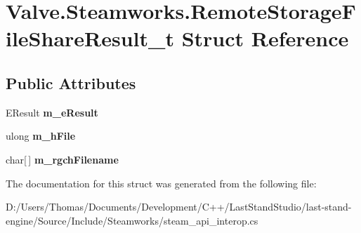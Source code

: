 \hypertarget{structValve_1_1Steamworks_1_1RemoteStorageFileShareResult__t}{}\section{Valve.\+Steamworks.\+Remote\+Storage\+File\+Share\+Result\+\_\+t Struct Reference}
\label{structValve_1_1Steamworks_1_1RemoteStorageFileShareResult__t}
\subsection*{Public Attributes}
\begin{DoxyCompactItemize}
\item 
\hypertarget{structValve_1_1Steamworks_1_1RemoteStorageFileShareResult__t_a9164c136f626671a9725c2df95616c37}{}E\+Result {\bfseries m\+\_\+e\+Result}\label{structValve_1_1Steamworks_1_1RemoteStorageFileShareResult__t_a9164c136f626671a9725c2df95616c37}

\item 
\hypertarget{structValve_1_1Steamworks_1_1RemoteStorageFileShareResult__t_afe8bde5721e16ba2b95162e74b371c83}{}ulong {\bfseries m\+\_\+h\+File}\label{structValve_1_1Steamworks_1_1RemoteStorageFileShareResult__t_afe8bde5721e16ba2b95162e74b371c83}

\item 
\hypertarget{structValve_1_1Steamworks_1_1RemoteStorageFileShareResult__t_a14382a9e447d8c4437b97d7c7bf47061}{}char\mbox{[}$\,$\mbox{]} {\bfseries m\+\_\+rgch\+Filename}\label{structValve_1_1Steamworks_1_1RemoteStorageFileShareResult__t_a14382a9e447d8c4437b97d7c7bf47061}

\end{DoxyCompactItemize}


The documentation for this struct was generated from the following file\+:\begin{DoxyCompactItemize}
\item 
D\+:/\+Users/\+Thomas/\+Documents/\+Development/\+C++/\+Last\+Stand\+Studio/last-\/stand-\/engine/\+Source/\+Include/\+Steamworks/steam\+\_\+api\+\_\+interop.\+cs\end{DoxyCompactItemize}
